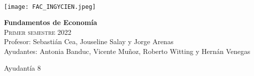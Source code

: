 \documentclass[addpoints,answers]{exam}
\begin{document}


\begin{multicols}{2}

\vspace*{0.24cm}\\
	\texttt{[image: FAC\_INGYCIEN.jpeg]}\\
	\begin{center}
		\textbf{Fundamentos de Economía}\\
		\textsc{Primer semestre 2022}\\
		Profesor: Sebastián Cea, Jouseline Salay y Jorge Arenas\\
		Ayudantes: Antonia Banduc, Vicente Muñoz, Roberto Witting y Hernán Venegas
	\end{center}

\end{multicols}

\begin{center}

\sc Ayudantía 8

\end{center}
\end{document}
